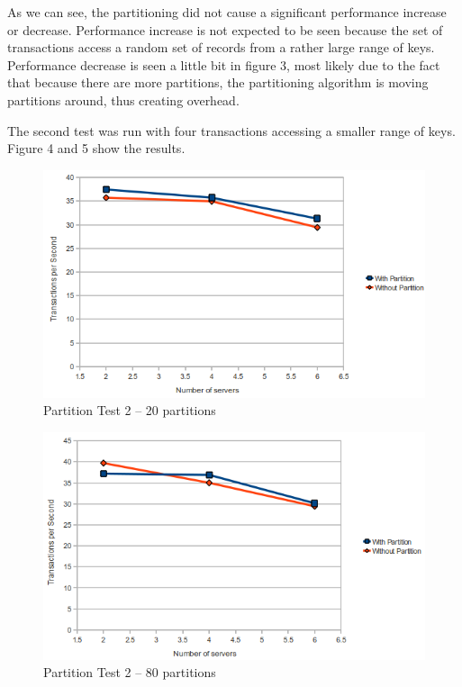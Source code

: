 \documentclass[a4paper, 10pt, notitlepage]{article}
\begin{document}
As we can see, the partitioning did not cause a significant performance increase or decrease. Performance increase is not expected to be seen because
the set of transactions access a random set of records from a rather large range of keys. Performance decrease is seen a little bit
in figure 3, most likely due to the fact that because there are more partitions, the partitioning algorithm is moving partitions
around, thus creating overhead.

The second test was run with four transactions accessing a smaller range of keys. Figure 4 and 5 show the results.

\begin{figure}[h!]

  \centering
    \includegraphics[scale=0.7]{peval3.png}
  \caption{Partition Test 2 -- 20 partitions}
\end{figure}

\begin{figure}[h!]

  \centering
    \includegraphics[scale=0.7]{peval4.png}
  \caption{Partition Test 2 -- 80 partitions}
\end{figure}
\end{document}
